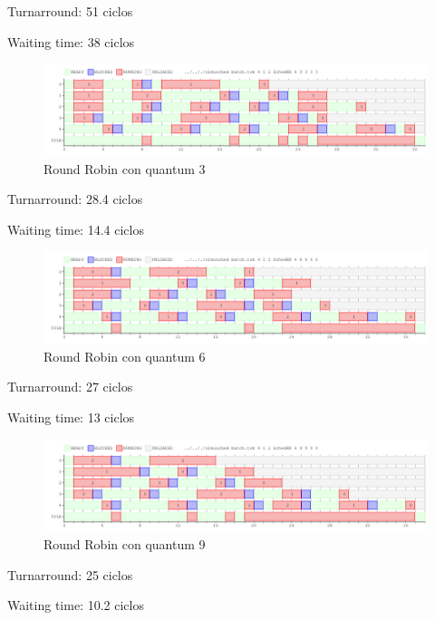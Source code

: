 Turnarround: 51 ciclos

Waiting time: 38 ciclos 

\begin{figure}[H]
\begin{center}
\includegraphics[width=1.1\textwidth]{img/core4q3.png}
     \caption{Round Robin con quantum 3}
\end{center}
\end{figure}

Turnarround: 28.4 ciclos

Waiting time: 14.4 ciclos 

\begin{figure}[H]
\begin{center}
\includegraphics[width=1.1\textwidth]{img/core4q6.png}
     \caption{Round Robin con quantum 6}
\end{center}
\end{figure}

Turnarround: 27 ciclos

Waiting time: 13 ciclos 

\begin{figure}[H]
\begin{center}
\includegraphics[width=1.1\textwidth]{img/core4q9.png}
     \caption{Round Robin con quantum 9}
\end{center}
\end{figure}

Turnarround: 25 ciclos

Waiting time: 10.2 ciclos 

